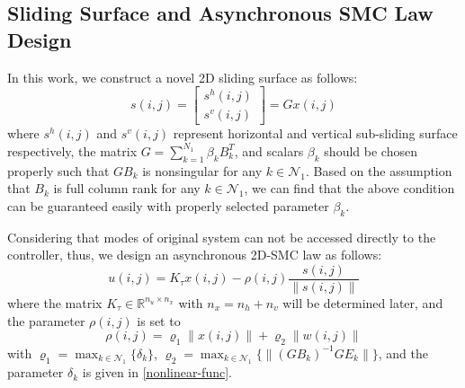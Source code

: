\documentclass[journal,final,twocolumn]{IEEEtran}
\begin{document}
\subsection{ Sliding Surface and Asynchronous SMC Law Design} \label{sliding-surface}
	In this work, we construct a novel 2D sliding surface as follows: 
	\begin{equation}\label{siding-surface-equation}	
		s(i,j) = \begin{bmatrix}
					s^{h}(i,j)\\
					s^{v}(i,j)
					\end{bmatrix}
			   = Gx(i,j)
	\end{equation}
	where $s^{h}(i,j)$ and $s^{v}(i,j)$ represent horizontal and vertical sub-sliding surface respectively, the matrix $G=\sum_{k=1}^{N_{1}}\beta_{k}B^{T}_{k}$, and scalars $\beta_{k}$ should be chosen properly such that $GB_{k}$ is nonsingular for any $k\in\mathcal{N}_{1}$. Based on the assumption that $B_{k}$ is full column rank for any $k\in\mathcal{N}_{1}$, we can find that the above condition can be guaranteed easily with properly selected parameter $\beta_{k}$. 
 	
 	Considering that modes of original system can not be  accessed  directly to the controller,  thus, we design an asynchronous 2D-SMC law as follows:
	\begin{equation}\label{smc-law}
		u(i,j) = K_{\tau }x(i,j)-\rho(i,j)\frac{s(i,j)}{\|s(i,j)\|}
	\end{equation}
	where the matrix $K_{\tau }\in\mathbb{R}^{n_u\times n_x}$ with $n_x=n_h+n_v$ will be determined later, and the parameter $\rho(i,j)$ is set to
	\begin{equation}\label{varrho}
	\rho(i,j) = \varrho_{1}\|x(i,j)\| + \varrho_{2}\|w(i,j)\|
	\end{equation}
	with $\varrho_{1}=\max_{k\in\mathcal{N}_{1}} \{\delta_{k} \}$, $\varrho_{2} = \max_{k\in\mathcal{N}_{1}}\{\|(GB_{k})^{-1}GE_{k}\| \} $, and the parameter $\delta_{k}$ is given in \eqref{nonlinear-func}. 
	
\end{document}
